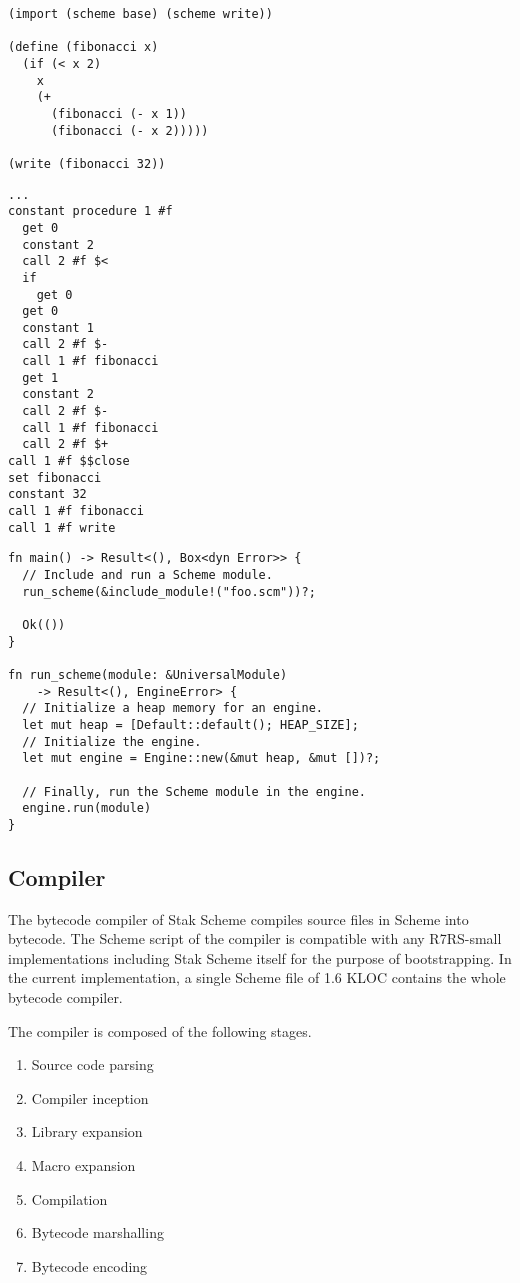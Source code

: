 \documentclass[sigplan, anonymous, review]{acmart}
\begin{document}
\begin{lstlisting}[float, caption=\texttt{foo.scm} file, label=list:scheme]
(import (scheme base) (scheme write))

(define (fibonacci x)
  (if (< x 2)
    x
    (+
      (fibonacci (- x 1))
      (fibonacci (- x 2)))))

(write (fibonacci 32))
\end{lstlisting}

\begin{lstlisting}[float, caption=Disassembled \texttt{foo.bc} file, label=list:bytecode]
...
constant procedure 1 #f
  get 0
  constant 2
  call 2 #f $<
  if
    get 0
  get 0
  constant 1
  call 2 #f $-
  call 1 #f fibonacci
  get 1
  constant 2
  call 2 #f $-
  call 1 #f fibonacci
  call 2 #f $+
call 1 #f $$close
set fibonacci
constant 32
call 1 #f fibonacci
call 1 #f write
\end{lstlisting}

\begin{lstlisting}[float, caption=\texttt{main.rs} file, label=list:rust]
fn main() -> Result<(), Box<dyn Error>> {
  // Include and run a Scheme module.
  run_scheme(&include_module!("foo.scm"))?;

  Ok(())
}

fn run_scheme(module: &UniversalModule)
    -> Result<(), EngineError> {
  // Initialize a heap memory for an engine.
  let mut heap = [Default::default(); HEAP_SIZE];
  // Initialize the engine.
  let mut engine = Engine::new(&mut heap, &mut [])?;

  // Finally, run the Scheme module in the engine.
  engine.run(module)
}
\end{lstlisting}

\subsection{Compiler} \label{compiler}

The bytecode compiler of Stak Scheme compiles source files in Scheme
into bytecode.
The Scheme script of the compiler is compatible with any R7RS-small
implementations including Stak Scheme itself for the purpose of bootstrapping.
In the current implementation, a single Scheme file of 1.6 KLOC
contains the whole bytecode compiler.

The compiler is composed of the following stages.

\begin{enumerate}
  \item Source code parsing
  \item Compiler inception
  \item Library expansion
  \item Macro expansion
  \item Compilation
  \item Bytecode marshalling
  \item Bytecode encoding
\end{enumerate}
\end{document}

